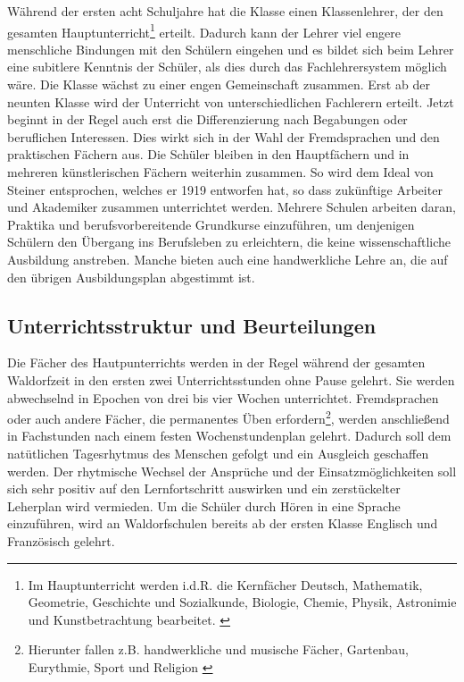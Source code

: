 Während der ersten acht Schuljahre hat die Klasse einen Klassenlehrer, der den gesamten Hauptunterricht\footnote{Im Hauptunterricht werden i.d.R. die Kernfächer Deutsch, Mathematik, Geometrie, Geschichte und Sozialkunde, Biologie, Chemie, Physik, Astronimie und Kunstbetrachtung bearbeitet. \citep[Vgl.][S. 50]{kiersch07}} erteilt. Dadurch kann der Lehrer viel engere menschliche Bindungen mit den Schülern eingehen und es bildet sich beim Lehrer eine subitlere Kenntnis der Schüler, als dies durch das Fachlehrersystem möglich wäre. Die Klasse wächst zu einer engen Gemeinschaft zusammen. Erst ab der neunten Klasse wird der Unterricht von unterschiedlichen Fachlerern erteilt. Jetzt beginnt in der Regel auch erst die Differenzierung nach Begabungen oder beruflichen Interessen. Dies wirkt sich in der Wahl der Fremdsprachen und den praktischen Fächern aus. Die Schüler bleiben in den Hauptfächern und in mehreren künstlerischen Fächern weiterhin zusammen. So wird dem Ideal von Steiner entsprochen, welches er 1919 entworfen hat, so dass zukünftige Arbeiter und Akademiker zusammen unterrichtet werden. Mehrere Schulen arbeiten daran, Praktika und berufsvorbereitende Grundkurse einzuführen, um denjenigen Schülern den Übergang ins Berufsleben zu erleichtern, die keine wissenschaftliche Ausbildung anstreben. Manche bieten auch eine handwerkliche Lehre an, die auf den übrigen Ausbildungsplan abgestimmt ist.  \citep[Vgl.][]{kiersch07, hemleben63}

\subsection{Unterrichtsstruktur und Beurteilungen} %
\label{sub:unterrichtsstruktur_und_Beurteilungen}


Die Fächer des Hautpunterrichts werden in der Regel während der gesamten Waldorfzeit in den ersten zwei Unterrichtsstunden ohne Pause gelehrt. Sie werden abwechselnd in Epochen von drei bis vier Wochen unterrichtet. Fremdsprachen oder auch andere Fächer, die permanentes Üben erfordern\footnote{Hierunter fallen z.B. handwerkliche und musische Fächer, Gartenbau, Eurythmie, Sport und Religion \citep[Vgl.][]{waldorfschule13}}, werden anschließend in Fachstunden nach einem festen Wochenstundenplan gelehrt. Dadurch soll dem natütlichen Tagesrhytmus des Menschen gefolgt und ein Ausgleich geschaffen werden. Der rhytmische Wechsel der Ansprüche und der Einsatzmöglichkeiten soll sich sehr positiv auf den Lernfortschritt auswirken und ein zerstückelter Leherplan wird vermieden. Um die Schüler durch Hören in eine Sprache einzuführen, wird an Waldorfschulen bereits ab der ersten Klasse Englisch und Französisch gelehrt. \citep[Vgl.][]{kiersch07, hemleben63} 

